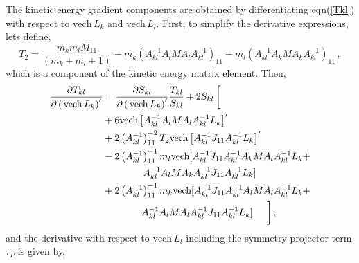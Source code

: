 \documentclass[12pt]{article}
\begin{document}
The kinetic energy gradient components are obtained by differentiating
eqn(\ref{Tkl}) with respect to $\mathrm{vech}\,L_{k}$ and $\mathrm{vech}%
\,L_{l}.$ First, to simplify the derivative expressions, lets define,
\begin{equation}
T_{2}=\frac{m_{k}m_{l}M_{11}}{\left(  m_{k}+m_{l}+1\right)  }-m_{k}\left(
A_{kl}^{-1}A_{l}MA_{l}A_{kl}^{-1}\right)  _{11}-m_{l}\left(  A_{kl}^{-1}%
A_{k}MA_{k}A_{kl}^{-1}\right)  _{11}\,,
\end{equation}
which is a component of the kinetic energy matrix element. Then,
\begin{align}
\frac{\partial T_{kl}}{\partial\left(  \,\mathrm{vech}\,L_{k}\right)
^{\prime}} &  =\frac{\partial S_{kl}}{\partial\left(  \,\mathrm{vech}%
\,L_{k}\right)  ^{\prime}}\frac{T_{kl}}{S_{kl}}+2S_{kl}\left[
\begin{array}
[c]{c}%
\,\\
\,
\end{array}
\right.  \nonumber\\
&  +6\mathrm{vech}\left[  A_{kl}^{-1}A_{l}MA_{l}A_{kl}^{-1}L_{k}\right]
^{\prime}\nonumber\\
&  +2\left(  A_{kl}^{-1}\right)  _{11}^{-2}T_{2}\mathrm{vech}\left[
A_{kl}^{-1}J_{11}A_{kl}^{-1}L_{k}\right]  ^{\prime}\nonumber\\
&  -2\left(  A_{kl}^{-1}\right)  _{11}^{-1}m_{l}\mathrm{vech[}A_{kl}%
^{-1}J_{11}A_{kl}^{-1}A_{k}MA_{l}A_{kl}^{-1}L_{k}+\nonumber\\
&  \quad\quad\quad\,\quad A_{kl}^{-1}A_{l}MA_{k}A_{kl}^{-1}J_{11}A_{kl}%
^{-1}L_{k}]\nonumber\\
&  +2\left(  A_{kl}^{-1}\right)  _{11}^{-1}m_{k}\mathrm{vech[}A_{kl}%
^{-1}J_{11}A_{kl}^{-1}A_{l}MA_{l}A_{kl}^{-1}L_{k}+\nonumber\\
&  \quad\quad\quad\quad A_{kl}^{-1}A_{l}MA_{l}A_{kl}^{-1}J_{11}A_{kl}%
^{-1}L_{k}]\left.
\begin{array}
[c]{c}%
\,\\
\,
\end{array}
\right]  ,
\end{align}
and the derivative with respect to $\mathrm{vech}\,L_{l}$ including the
symmetry projector term $\tau_{P}$ is given by,
\end{document}
